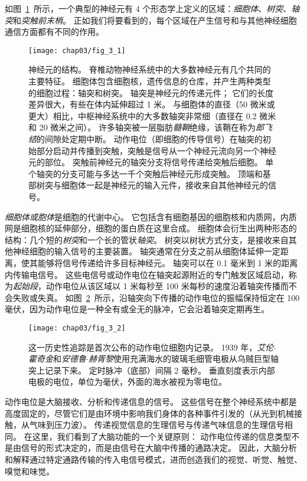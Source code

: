如图~\ref{fig:3_1}~所示，一个典型的神经元有 4 个形态学上定义的区域：\textit{细胞体}、\textit{树突}、\textit{轴突}和\textit{突触前末梢}。
正如我们将要看到的，每个区域在产生信号和与其他神经细胞通信方面都有不同的作用。


\begin{figure}[htbp]
	\centering
	\texttt{[image: chap03/fig\_3\_1]}
	\caption{神经元的结构。 
		脊椎动物神经系统中的大多数神经元有几个共同的主要特征。
		细胞体包含细胞核，遗传信息的仓库，并产生两种类型的细胞过程：轴突和树突。 
		轴突是神经元的传递元件；
		它们的长度差异很大，有些在体内延伸超过 1 米。 
		与细胞体的直径（50 微米或更大）相比，中枢神经系统中的大多数轴突非常细（直径在 0.2 微米和 20 微米之间）。 
		许多轴突被一层脂肪\textit{髓鞘}绝缘，该鞘在称为\textit{郎飞结}的间隙处定期中断。 
		动作电位（即细胞的传导信号）在轴突的初始部分启动并传播到突触，突触是信号从一个神经元流向另一个神经元的部位。 
		突触前神经元的轴突分支将信号传递给突触后细胞。 
		单个轴突的分支可能与多达一千个突触后神经元形成突触。 	
		顶端和基部树突与细胞体一起是神经元的输入元件，接收来自其他神经元的信号。}
	\label{fig:3_1}
\end{figure}


\textit{细胞体或胞体}是细胞的代谢中心。 
它包括含有细胞基因的细胞核和内质网，内质网是细胞核的延伸部分，细胞的蛋白质在这里合成。
细胞体会衍生出两种形态的结构：几个短的\textit{树突}和一个长的管状\textit{轴突}。 
树突以树状方式分支，是接收来自其他神经细胞的输入信号的主要装置。 
轴突通常在分支之前从细胞体延伸一定距离，使其能够将信号传递给许多目标神经元。
轴突可以在 0.1 毫米到 1 米的距离内传输电信号。 
这些电信号或动作电位在轴突起源附近的专门触发区域启动，称为\textit{起始段}，动作电位从该区域以 1 米每秒至 100 米每秒的速度沿着轴突传播而不会失败或失真。 
如图~\ref{fig:3_2}~所示，沿轴突向下传播的动作电位的振幅保持恒定在 100 毫伏，因为动作电位是一种全有或全无的脉冲，它会沿着轴突定期再生。


\begin{figure}[htbp]
	\centering
	\texttt{[image: chap03/fig\_3\_2]}
	\caption{这一历史性追踪是首次公布的动作电位细胞内记录。 
		1939 年，\textit{艾伦$\cdot$霍奇金}和\textit{安德鲁$\cdot$赫胥黎}使用充满海水的玻璃毛细管电极从乌贼巨型轴突上记录下来。
		定时脉冲（底部）间隔 2 毫秒。 
		垂直刻度表示内部电极的电位，单位为毫伏，外面的海水被视为零电位\cite{hodgkin1939action}。}
	\label{fig:3_2}
\end{figure}


动作电位是大脑接收、分析和传递信息的信号。 
这些信号在整个神经系统中都是高度固定的，尽管它们是由环境中影响我们身体的各种事件引发的（从光到机械接触，从气味到压力波）。
传递视觉信息的生理信号与传递气味信息的生理信号相同。
在这里，我们看到了大脑功能的一个关键原则：
动作电位传递的信息类型不是由信号的形式决定的，而是由信号在大脑中传播的通路决定。
因此，大脑分析和解释通过特定通路传输的传入电信号模式，进而创造我们的视觉、听觉、触觉、嗅觉和味觉。


